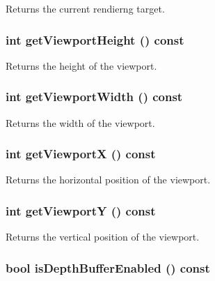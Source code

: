 Returns the current rendierng target. \hypertarget{classm3g_1_1Graphics3D_d51e0c421126f5deb61b359cdb7dab2e}{
\subsubsection[{getViewportHeight}]{\setlength{\rightskip}{0pt plus 5cm}int getViewportHeight () const}}
\label{classm3g_1_1Graphics3D_d51e0c421126f5deb61b359cdb7dab2e}


Returns the height of the viewport. \hypertarget{classm3g_1_1Graphics3D_768e5c057e2fa4c4b17a67134abbf89f}{
\subsubsection[{getViewportWidth}]{\setlength{\rightskip}{0pt plus 5cm}int getViewportWidth () const}}
\label{classm3g_1_1Graphics3D_768e5c057e2fa4c4b17a67134abbf89f}


Returns the width of the viewport. \hypertarget{classm3g_1_1Graphics3D_af58b44cc6219f86c40dadb8a9377856}{
\subsubsection[{getViewportX}]{\setlength{\rightskip}{0pt plus 5cm}int getViewportX () const}}
\label{classm3g_1_1Graphics3D_af58b44cc6219f86c40dadb8a9377856}


Returns the horizontal position of the viewport. \hypertarget{classm3g_1_1Graphics3D_c21665afbf94a8f0153e099833c2b61a}{
\subsubsection[{getViewportY}]{\setlength{\rightskip}{0pt plus 5cm}int getViewportY () const}}
\label{classm3g_1_1Graphics3D_c21665afbf94a8f0153e099833c2b61a}


Returns the vertical position of the viewport. \hypertarget{classm3g_1_1Graphics3D_7f17c6781152840d42e756c27b0fb8c8}{
\subsubsection[{isDepthBufferEnabled}]{\setlength{\rightskip}{0pt plus 5cm}bool isDepthBufferEnabled () const}}
\label{classm3g_1_1Graphics3D_7f17c6781152840d42e756c27b0fb8c8}


